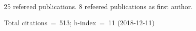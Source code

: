 25 refereed publications. 8 refeered publications as first author.

Total citations~=~513; h-index~=~11 (2018-12-11)